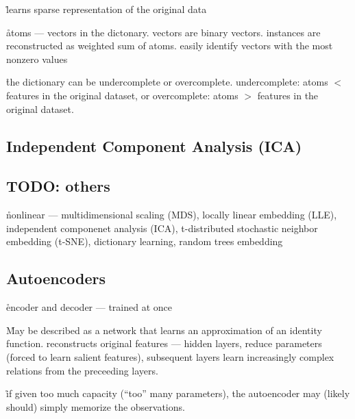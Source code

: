 
\r{learns sparse representation of the original data}

\r{atoms --- vectors in the dictonary. vectors are binary vectors. instances are reconstructed as weighted sum of atoms. easily identify vectors with the most nonzero values}

\r{the dictionary can be undercomplete or overcomplete. undercomplete: atoms $<$ features in the original dataset, or overcomplete: atoms $>$ features in the original dataset.}



\subsection{Independent Component Analysis (ICA)}


\subsection{TODO: others}





\r{nonlinear --- multidimensional scaling (MDS), locally linear embedding (LLE), independent componenet analysis (ICA), t-distributed stochastic neighbor embedding (t-SNE), dictionary learning, random trees embedding}

\subsection{Autoencoders}


\r{encoder and decoder --- trained at once}

\r{May be described as a network that learns an approximation of an identity function. reconstructs original features --- hidden layers, reduce parameters (forced to learn salient features), subsequent layers learn increasingly complex relations from the preceeding layers.}

\r{if given too much capacity (``too'' many parameters), the autoencoder may (likely should) simply memorize the observations.}

